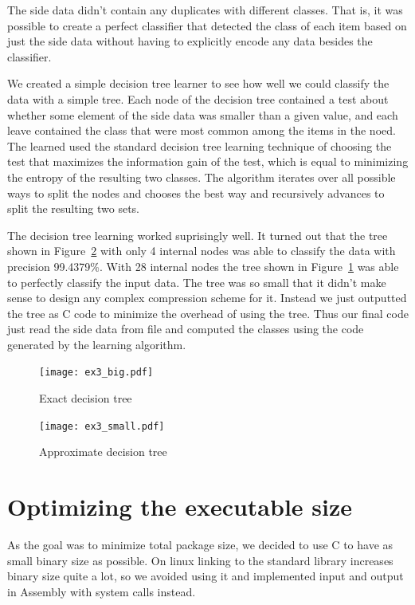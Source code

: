 \documentclass{article}
\begin{document}
The side data didn't contain any duplicates with different classes.
That is, it was possible to create a perfect classifier that detected the class of each item based on just the side data without having to explicitly encode any data besides the classifier.

We created a simple decision tree learner to see how well we could classify the data with a simple tree.
Each node of the decision tree contained a test about whether some element of the side data was smaller than a given value, and each leave contained the class that were most common among the items in the noed.
The learned used the standard decision tree learning technique of choosing the test that maximizes the information gain of the test, which is equal to minimizing the entropy of the resulting two classes.
The algorithm iterates over all possible ways to split the nodes and chooses the best way and recursively advances to split the resulting two sets.

The decision tree learning worked suprisingly well.
It turned out that the tree shown in Figure~\ref{fig:ex3small} with only 4 internal nodes was able to classify the data with precision 99.4379\%.
With 28 internal nodes the tree shown in Figure~\ref{fig:ex3big} was able to perfectly classify the input data.
The tree was so small that it didn't make sense to design any complex compression scheme for it.
Instead we just outputted the tree as C code to minimize the overhead of using the tree.
Thus our final code just read the side data from file and computed the classes using the code generated by the learning algorithm.

\begin{figure}
	\centerline{\texttt{[image: ex3\_big.pdf]}}
    \caption{Exact decision tree}\label{fig:ex3big}
\end{figure}

\begin{figure}
    \begin{center}
	\texttt{[image: ex3\_small.pdf]}
    \end{center}
    \caption{Approximate decision tree}\label{fig:ex3small}
\end{figure}

\section{Optimizing the executable size}

As the goal was to minimize total package size, we decided to use C to have as small binary size as possible.
On linux linking to the standard library increases binary size quite a lot, so we avoided using it and implemented input and output in Assembly with system calls instead.




%

\end{document}
